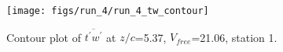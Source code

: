 \begin{figure}[H]
\centering
\texttt{[image: figs/run\_4/run\_4\_tw\_contour]}
\caption{Contour plot of $\overline{t^\prime w^\prime}$ at $z/c$=5.37, $V_{free}$=21.06, station 1.}
\label{fig:run_4_tw_contour}
\end{figure}


